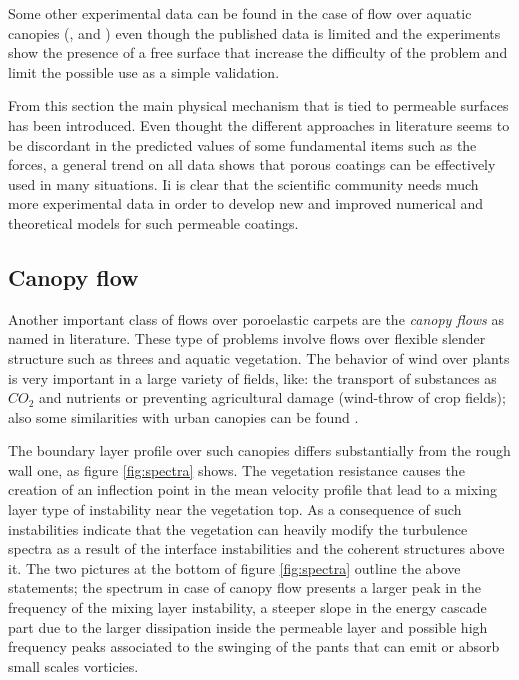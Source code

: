 Some other experimental data can be found in the case of flow over aquatic canopies (\citet{zhang2011exchange}, \citet{segalini2011experimental} and \citet{hamed2017impact}) even though the published data is limited and the experiments show the presence of a free surface that increase the difficulty of the problem and limit the possible use as a simple validation.

From this section the main physical mechanism that is tied to permeable surfaces has been introduced.
Even thought the different approaches in literature seems to be discordant in the predicted values of some fundamental items such as the forces, a general trend on all  data shows that porous coatings can be effectively used in many situations.
Ii is clear that the scientific community needs much more experimental data in order to develop new and improved numerical and theoretical models for such permeable coatings.

\subsection{Canopy flow}

Another important class of flows over poroelastic carpets are the \textit{canopy flows} as named in literature.
These type of problems involve flows over flexible slender structure such as threes and aquatic vegetation.
The behavior of wind over plants is very important in a large variety of fields, like: the transport of substances as $CO_2$ and nutrients or preventing agricultural damage (wind-throw of crop fields); also some similarities with urban canopies can be found \citet{ghisalberti2009obstructed}.

The boundary layer profile over such canopies differs substantially from the rough wall one, as figure \ref{fig:spectra} shows.
The vegetation resistance causes the creation of an inflection point in the mean velocity profile that lead to a mixing layer type of instability near the vegetation top.
As a consequence of such instabilities \citet{finnigan2000turbulence} indicate that the vegetation can heavily modify the turbulence spectra as a result of the interface instabilities and the coherent structures above it.
The two pictures at the bottom of figure \ref{fig:spectra} outline the above statements; the spectrum in case of canopy flow presents a larger peak in the frequency of the mixing layer instability, a steeper slope in the energy cascade part due to the larger dissipation inside the permeable layer and possible high frequency peaks associated to the swinging of the pants that can emit or absorb small scales vorticies.
 
